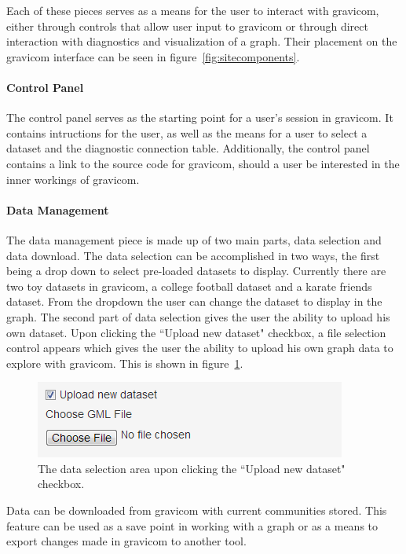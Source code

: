 \documentclass{article}\usepackage[]{graphicx}\usepackage[]{color}
\begin{document}
Each of these pieces serves as a means for the user to interact with gravicom, either through controls that allow user input to gravicom or through direct interaction with diagnostics and visualization of a graph. Their placement on the gravicom interface can be seen in figure~\ref{fig:sitecomponents}.

\paragraph{Control Panel}
The control panel serves as the starting point for a user's session in gravicom. It contains intructions for the user, as well as the means for a user to select a dataset and the diagnostic connection table. Additionally, the control panel contains a link to the source code for gravicom, should a user be interested in the inner workings of gravicom.

\paragraph{Data Management}
The data management piece is made up of two main parts, data selection and data download. The data selection can be accomplished in two ways, the first being a drop down to select pre-loaded datasets to display. Currently there are two toy datasets in gravicom, a college football dataset and a karate friends dataset. From the dropdown the user can change the dataset to display in the graph. The second part of data selection gives the user the ability to upload his own dataset. Upon clicking the ``Upload new dataset" checkbox, a file selection control appears which gives the user the ability to upload his own graph data to explore with gravicom. This is shown in figure~\ref{fig:uploadnewdataset}. 

\begin{figure}[H]
\centering
\includegraphics[]{images/uploadnewdataset.png}
\caption{\label{fig:uploadnewdataset} The data selection area upon clicking the ``Upload new dataset" checkbox.}
\end{figure}

Data can be downloaded from gravicom with current communities stored. This feature can be used as a save point in working with a graph or as a means to export changes made in gravicom to another tool.
\end{document}
